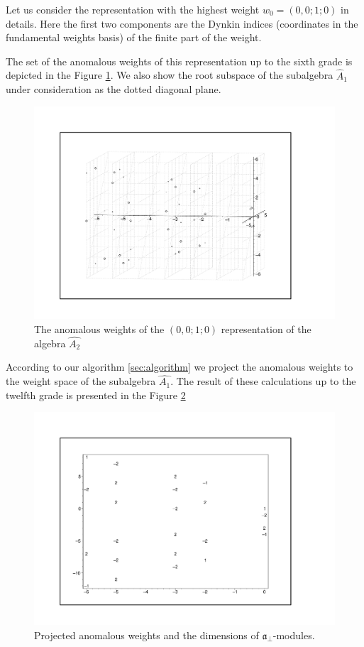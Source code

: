 \documentclass[a4paper,12pt]{article}
\theoremstyle{definition} \newtheorem{Def}{Definition}
\begin{document}
Let us consider the representation with the highest weight $w_0=(0,0;1;0)$ in details. Here the first two components are the Dynkin indices (coordinates in the fundamental weights basis) of the finite part of the weight.

The set of the anomalous weights of this representation up to the sixth grade is depicted in the Figure \ref{fig:affine_A2_anom_point}. We also show the root subspace of the subalgebra $\hat{A}_1$ under consideration as the dotted diagonal plane.

\begin{figure}[h!tb]
  \centering
  \includegraphics[width=180mm]{AffineA2_A1_anom.pdf}
  \caption{The anomalous weights of the $(0,0;1;0)$ representation of the algebra $\hat{A_2}$}
  \label{fig:affine_A2_anom_point}
\end{figure}

According to our algorithm \ref{sec:algorithm} we project the anomalous weights to the weight space of the subalgebra $\hat{A_1}$.
The result of these calculations up to the twelfth grade is presented in the Figure \ref{fig:AffineA2_A1_anom_proj}
\begin{figure}[h!tb]
  \centering
  \includegraphics[width=150mm]{AffineA2_A1_proj_anom.pdf}
  \caption{Projected anomalous weights and the dimensions of $\mathfrak{a}_{\bot}$-modules.}
  \label{fig:AffineA2_A1_anom_proj}
\end{figure}
\end{document}
